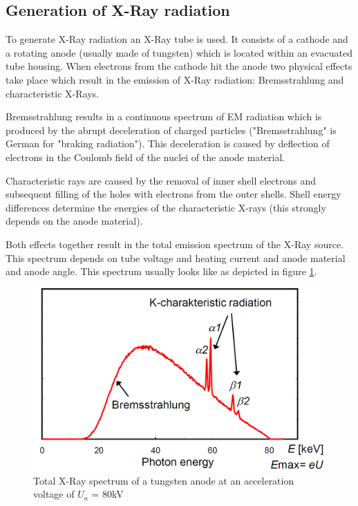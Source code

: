 \subsection{Generation of X-Ray radiation\cite{IIIP_3_1}}
\par To generate X-Ray radiation an X-Ray tube is used. It consists of a cathode and a rotating anode (usually made of tungsten) which is located within an evacuated tube housing. When electrons from the cathode hit the anode two physical effects take place which result in the emission of X-Ray radiation: Bremsstrahlung and characteristic X-Rays.
\par Bremsstrahlung results in a continuous spectrum of EM radiation which is produced by the abrupt deceleration of charged particles ("Bremsstrahlung" is German for "braking radiation"). This deceleration is caused by deflection of electrons in the Coulomb field of the nuclei of the anode material.
\par Characteristic rays are caused by the removal of inner shell electrons and subsequent filling of the holes with electrons from the outer shells. Shell energy differences determine the energies of the characteristic X-rays (this strongly depends on the anode material).
\par Both effects together result in the total emission spectrum of the X-Ray source. This spectrum depends on tube voltage and heating current and anode material and anode angle. This spectrum usually looks like as depicted in figure \ref{spectrum}.
\begin{figure}[h]
	\centering
	\includegraphics[width=0.9\linewidth]{images/spectrum.png}
	\caption{Total X-Ray spectrum of a tungsten anode at an acceleration voltage of \(U_a\) = 80kV\cite{IIIP_3_1}}
	\label{spectrum}
\end{figure}
